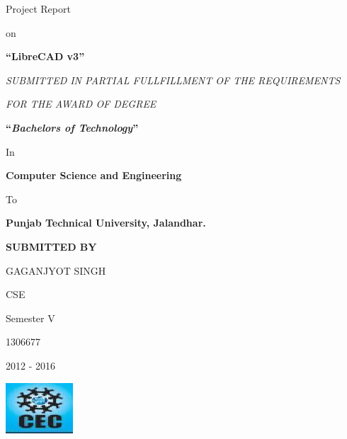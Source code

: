 \thispagestyle{empty}
\begin{center}
{\fontsize{24}{30}\selectfont Project Report}

\vspace*{\baselineskip}

{\fontsize{18}{30}\selectfont on}

\vspace*{\baselineskip}

{\bfseries\fontsize{24}{30}\selectfont ``LibreCAD v3''}

\vspace*{2\baselineskip}

{
    \fontsize{10}{30}\textit {SUBMITTED IN PARTIAL FULLFILLMENT OF THE REQUIREMENTS}
    
    \vspace*{\baselineskip}
    
    \textit{ FOR THE AWARD OF DEGREE}
}

\vspace*{2\baselineskip}

{\bfseries\fontsize{16}{30}\selectfont ``\textit{Bachelors of Technology}''}

\vspace*{\baselineskip}

In

\vspace*{\baselineskip}

{\bfseries\fontsize{14}{20}\selectfont Computer Science and Engineering }
\vspace*{\baselineskip}

To
\vspace*{\baselineskip}

{\bfseries\fontsize{14}{20}\selectfont Punjab Technical University, Jalandhar.}

\vspace*{3\baselineskip}

{\bfseries\fontsize{12}{20}\selectfont SUBMITTED BY}

{\fontsize{12}{20}\selectfont

GAGANJYOT SINGH

CSE

Semester V

1306677

2012 - 2016

}

\vspace*{2\baselineskip}

\includegraphics[scale=1.5]{images/CEC.jpg}


\end{center}
